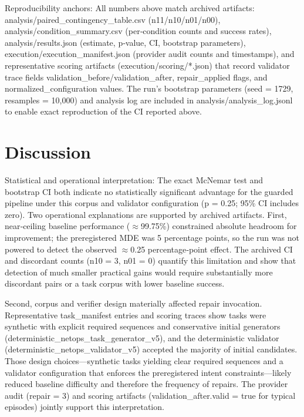 \documentclass[conference]{IEEEtran}
\begin{document}
Reproducibility anchors: All numbers above match archived artifacts: analysis/paired\_contingency\_table.csv (n11/n10/n01/n00), analysis/condition\_summary.csv (per‑condition counts and success rates), analysis/results.json (estimate, p‑value, CI, bootstrap parameters), execution/execution\_manifest.json (provider audit counts and timestamps), and representative scoring artifacts (execution/scoring/*.json) that record validator trace fields validation\_before/validation\_after, repair\_applied flags, and normalized\_configuration values. The run's bootstrap parameters (seed = 1729, resamples = 10,000) and analysis log are included in analysis/analysis\_log.jsonl to enable exact reproduction of the CI reported above.

\section{Discussion}
Statistical and operational interpretation: The exact McNemar test and bootstrap CI both indicate no statistically significant advantage for the guarded pipeline under this corpus and validator configuration (p = 0.25; 95\% CI includes zero). Two operational explanations are supported by archived artifacts. First, near‑ceiling baseline performance (\ensuremath{\approx}99.75\%) constrained absolute headroom for improvement; the preregistered MDE was 5 percentage points, so the run was not powered to detect the observed \ensuremath{\approx}0.25 percentage‑point effect. The archived CI and discordant counts (n10 = 3, n01 = 0) quantify this limitation and show that detection of much smaller practical gains would require substantially more discordant pairs or a task corpus with lower baseline success.

Second, corpus and verifier design materially affected repair invocation. Representative task\_manifest entries and scoring traces show tasks were synthetic with explicit required sequences and conservative initial generators (deterministic\_netops\_task\_generator\_v5), and the deterministic validator (deterministic\_netops\_validator\_v5) accepted the majority of initial candidates. Those design choices---synthetic tasks yielding clear required sequences and a validator configuration that enforces the preregistered intent constraints---likely reduced baseline difficulty and therefore the frequency of repairs. The provider audit (repair = 3) and scoring artifacts (validation\_after.valid = true for typical episodes) jointly support this interpretation.
\end{document}
